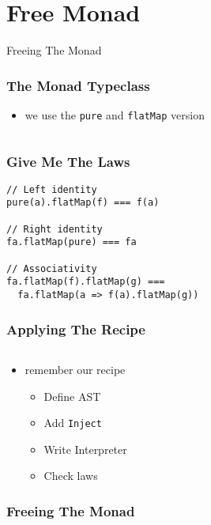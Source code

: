 \documentclass{beamer}
\newcommand{\recipe}{%
  \begin{itemize}
  \item Define AST
  \item Add \texttt{Inject}
  \item Write Interpreter
  \item Check laws
  \end{itemize}
}
\begin{document}
\section{Free Monad}\label{sec:free-monad}
\begin{frame}
  \begin{center}
    \Huge
    Freeing The Monad
  \end{center}
\end{frame}

\begin{frame}[fragile]
  \frametitle{The Monad Typeclass}
  \begin{itemize}
  \item we use the \texttt{pure} and \texttt{flatMap} version
  \end{itemize}
  \begin{center}
    \inputminted{scala}{snippets/monad-typeclass.scala}
  \end{center}
\end{frame}

\begin{frame}[fragile]
  \frametitle{Give Me The Laws}
    \begin{center}
\begin{verbatim}
// Left identity
pure(a).flatMap(f) === f(a)

// Right identity
fa.flatMap(pure) === fa

// Associativity
fa.flatMap(f).flatMap(g) ===
  fa.flatMap(a => f(a).flatMap(g))
\end{verbatim}
    \end{center}
\end{frame}

\begin{frame}[fragile]
  \frametitle{Applying The Recipe}
  \begin{center}
    \inputminted{scala}{snippets/monad-typeclass.scala}
  \end{center}
  \begin{itemize}
  \item remember our recipe
    \recipe{}
  \end{itemize}
\end{frame}

\begin{frame}[fragile]
  \frametitle{Freeing The Monad}
  \begin{center}
    \inputminted{scala}{snippets/free-monad.scala}
  \end{center}
\end{frame}
\end{document}
